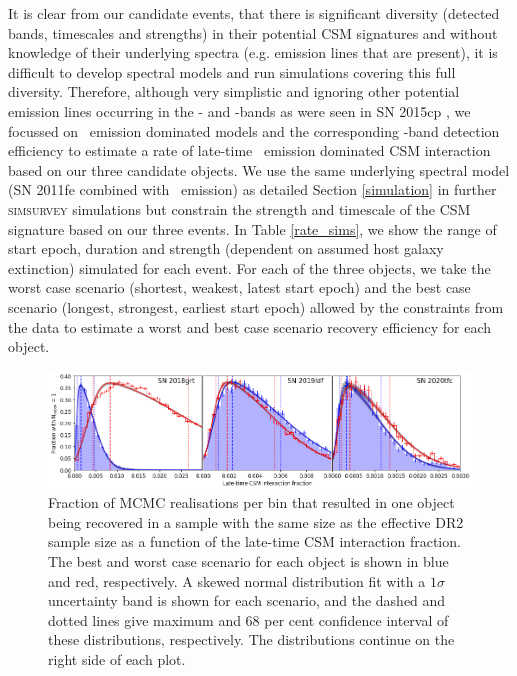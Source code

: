 \documentclass[a4paper,oneside,12pt, class=Latex/Classes/PhDthesisPSnPDF, crop=false]{standalone}
\begin{document}
It is clear from our candidate events, that there is significant diversity (detected bands, timescales and strengths) in their potential CSM signatures and without knowledge of their underlying spectra (e.g. emission lines that are present), it is difficult to develop spectral models and run simulations covering this full diversity. Therefore, although very simplistic and ignoring other potential emission lines occurring in the \ztfg- and \ztfi-bands as were seen in SN 2015cp \citep{2015cp}, we focussed on \Halpha~emission dominated models and the corresponding \ztfr-band detection efficiency to estimate a rate of late-time \Halpha~emission dominated CSM interaction based on our three candidate objects. We use the same underlying spectral model (SN 2011fe combined with \Halpha~emission) as detailed Section \ref{simulation} in further \textsc{simsurvey} simulations but constrain the strength and timescale of the CSM signature based on our three events. In Table \ref{rate_sims}, we show the range of start epoch, duration and strength (dependent on assumed host galaxy extinction) simulated for each event. For each of the three objects, we take the worst case scenario (shortest, weakest, latest start epoch) and the best case scenario (longest, strongest, earliest start epoch) allowed by the constraints from the data to estimate a worst and best case scenario recovery efficiency for each object.


\begin{figure}
 \centering
 \includegraphics[width=\textwidth]{../Images/chapter_3/rateplots.png}
 \caption{Fraction of MCMC realisations per bin that resulted in one object being recovered in a sample with the same size as the effective DR2 sample size as a function of the late-time CSM interaction fraction. The best and worst case scenario for each object is shown in blue and red, respectively. A skewed normal distribution fit with a $1 \sigma$ uncertainty band is shown for each scenario, and the dashed and dotted lines give maximum and 68 per cent confidence interval of these distributions, respectively. The distributions continue on the right side of each plot.}
 \label{rate_fig}
\end{figure}
\end{document}
